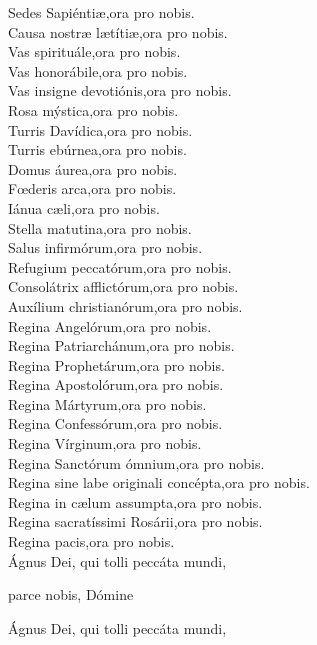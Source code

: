 Sedes Sapiénti{\ae},{\hfill}ora pro nobis.\\
Causa nostr{\ae} l{\ae}títi{\ae},{\hfill}ora pro nobis.\\
Vas spirituále,{\hfill}ora pro nobis.\\
Vas honorábile,{\hfill}ora pro nobis.\\
Vas insigne devotiónis,{\hfill}ora pro nobis.\\
Rosa mýstica,{\hfill}ora pro nobis.\\
Turris Davídica,{\hfill}ora pro nobis.\\
Turris ebúrnea,{\hfill}ora pro nobis.\\
Domus áurea,{\hfill}ora pro nobis.\\
F{\oe}deris arca,{\hfill}ora pro nobis.\\
Iánua c{\ae}li,{\hfill}ora pro nobis.\\
Stella matutina,{\hfill}ora pro nobis.\\
Salus infirmórum,{\hfill}ora pro nobis.\\
Refugium peccatórum,{\hfill}ora pro nobis.\\
Consolátrix afflictórum,{\hfill}ora pro nobis.\\
Auxílium christianórum,{\hfill}ora pro nobis.\\
Regina Angelórum,{\hfill}ora pro nobis.\\
Regina Patriarchánum,{\hfill}ora pro nobis.\\
Regina Prophetárum,{\hfill}ora pro nobis.\\
Regina Apostolórum,{\hfill}ora pro nobis.\\
Regina Mártyrum,{\hfill}ora pro nobis.\\
Regina Confessórum,{\hfill}ora pro nobis.\\
Regina Vírginum,{\hfill}ora pro nobis.\\
Regina Sanctórum ómnium,{\hfill}ora pro nobis.\\
Regina sine labe originali concépta,{\hfill}ora pro nobis.\\
Regina in c{\ae}lum assumpta,{\hfill}ora pro nobis.\\
Regina sacratíssimi Rosárii,{\hfill}ora pro nobis.\\
Regina pacis,{\hfill}ora pro nobis.\\
Ágnus Dei, qui tolli peccáta mundi,

{\hspace*{\fill}}parce nobis, Dómine  

Ágnus Dei, qui tolli peccáta mundi, 

